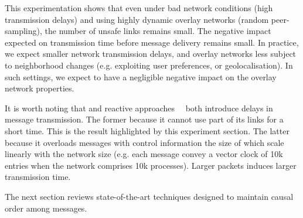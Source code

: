 This experimentation shows that even under bad network conditions (high
transmission delays) and using highly dynamic overlay networks (random
peer-sampling), the number of unsafe links remains small. The negative impact
expected on transmission time before message delivery remains small. In
practice, we expect smaller network transmission delays, and overlay networks
less subject to neighborhood changes (e.g. exploiting user preferences, or
geolocalisation). In such settings, we expect \CBROADCAST to have a negligible
negative impact on the overlay network properties.

It is worth noting that \CBROADCAST and reactive
approaches~\cite{almeida2008interval,fidge1988timestamps,mattern1989virtual,singhal1992efficient}~\cite{birman1987reliable,hadzilacos1993fault,mostefaoui2017probabilistic}
both introduce delays in message transmission. The former because it cannot use
part of its links for a short time. This is the result highlighted by this
experiment section.  The latter because it overloads messages with control
information the size of which scale linearly with the network size (e.g. each
message convey a vector clock of 10k entries when the network comprises 10k
processes).  Larger packets induces larger transmission time.

The next section reviews state-of-the-art techniques designed to maintain causal
order among messages.

